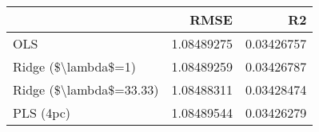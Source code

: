 \begin{tabular}{lrr}
\toprule
{} &        RMSE &          R2 \\
\midrule
OLS                     &  1.08489275 &  0.03426757 \\
Ridge (\$\textbackslash lambda\$=1)     &  1.08489259 &  0.03426787 \\
Ridge (\$\textbackslash lambda\$=33.33) &  1.08488311 &  0.03428474 \\
PLS (4pc)               &  1.08489544 &  0.03426279 \\
\bottomrule
\end{tabular}
